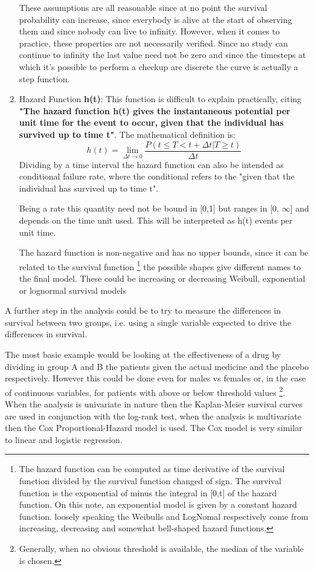 \begin{enumerate}
These assumptions are all reasonable since at no point the survival probability can increase, since everybody is alive at the start of observing them and since nobody can live to infinity.
However, when it comes to practice, these properties are not necessarily verified.
Since no study can continue to infinity the last value need not be zero and since the timesteps at which it's possible to perform a checkup are discrete the curve is actually a step function.

\item Hazard Function \textbf{h(t)}: This function is difficult to explain practically, citing \cite{SurvivalAnalysis} \textbf{"The hazard function h(t) gives the instantaneous potential per unit time for the event to occur, given that the individual has survived up to time t"}. The mathematical definition is:
\begin{equation}
h(t) = \lim\limits_{\Delta t \to 0} \frac{P(t\leq T < t + \Delta t | T\geq t)}{\Delta t}
\end{equation}
Dividing by a time interval the hazard function can also be intended as conditional failure rate, where the conditional refers to the "given that the individual has survived up to time t". 

Being a rate this quantity need not be bound in [0,1] but ranges in [0, $\infty$] and depends on the time unit used.
This will be interpreted as h(t) events per unit time.

The hazard function is non-negative and has no upper bounds, since it can be related to the survival function
\footnote{The hazard function can be computed as time derivative of the survival function divided by the survival function changed of sign. The survival function is the exponential of minus the integral in [0,t] of the hazard function. On this note, an exponential model is given by a constant hazard function. loosely speaking the Weibulls and LogNomal respectively come from increasing, decreasing and somewhat bell-shaped hazard functions.} 
the possible shapes give different names to the final model. 
These could be increasing or decreasing Weibull, exponential or lognormal survival models
\end{enumerate}

A further step in the analysis could be to try to measure the differences in survival between two groups, i.e. using a single variable expected to drive the differences in survival.

The most basic example would be looking at the effectiveness of a drug by dividing in group A and B the patients given the actual medicine and the placebo respectively. However this could be done even for males vs females or, in the case of continuous variables, for patients with above or below threshold values
\footnote{Generally, when no obvious threshold is available, the median of the variable is chosen.}.
When the analysis is univariate in nature then the Kaplan-Meier survival curves are used in conjunction with the log-rank test, when the analysis is multivariate then the Cox Proportional-Hazard model is used. 
The Cox model is very similar to linear and logistic regression.



